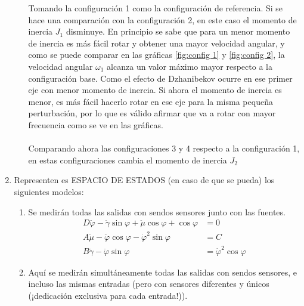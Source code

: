 \documentclass[letterpaper, 12pt]{article}
\begin{document}
\begin{enumerate}
\begin{enumerate}
Tomando la configuración 1 como la configuración de referencia. Si se hace una comparación con la configuración 2, en este caso el momento de inercia $J_1$ disminuye. En principio se sabe que para un menor momento de inercia es más fácil rotar y obtener una mayor velocidad angular, y como se puede comparar en las gráficas \ref{fig:config 1} y \ref{fig:config 2}, la velocidad angular $\omega_1$ alcanza un valor máximo mayor respecto a la configuración base.
Como el efecto de Dzhanibekov ocurre en ese primer eje con menor momento de inercia. Si ahora el momento de inercia es menor, es más fácil hacerlo rotar en ese eje para la misma pequeña perturbación, por lo que es válido afirmar que va a rotar con mayor frecuencia como se ve en las gráficas.
\\ \\
Comparando ahora las configuraciones 3 y 4 respecto a la configuración 1, en estas configuraciones cambia el momento de inercia $J_2$















\end{enumerate}
\item Representen es ESPACIO DE ESTADOS (en caso de que se pueda) los siguientes modelos:
\begin{enumerate}
\item Se medirán todas las salidas con sendos sensores junto con las fuentes.
\begin{equation}
\begin{split}
    D\ddot{\varphi} - \ddot{\gamma}\sin \varphi + \ddot{\mu}\cos \varphi + \cos \varphi &= 0 \\
    A\ddot{\mu} - \ddot{\varphi}\cos \varphi - {\dot{\varphi}}^2\sin \varphi &= C \\
    B\ddot{\gamma} - \ddot{\varphi}\sin \varphi &= {\dot{\varphi}}^2\cos \varphi
\end{split}
\end{equation}









\item Aquí se medirán simultáneamente todas las salidas con sendos sensores, e incluso las mismas entradas (pero con sensores diferentes y únicos (¡dedicación exclusiva para cada entrada!)).


\end{enumerate}
\end{enumerate}
\end{document}
